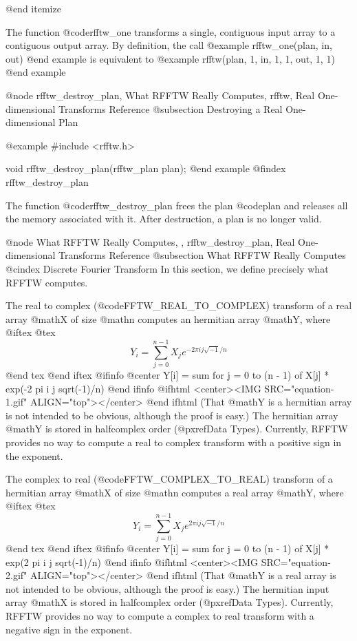 @end itemize

The function @code{rfftw_one} transforms a single, contiguous input array
to a contiguous output array.  By definition, the call
@example
rfftw_one(plan, in, out)
@end example
is equivalent to
@example
rfftw(plan, 1, in, 1, 1, out, 1, 1)
@end example

@node    rfftw_destroy_plan, What RFFTW Really Computes, rfftw, Real One-dimensional Transforms Reference
@subsection Destroying a Real One-dimensional Plan

@example
#include <rfftw.h>

void rfftw_destroy_plan(rfftw_plan plan);
@end example
@findex rfftw_destroy_plan

The function @code{rfftw_destroy_plan} frees the plan @code{plan} and
releases all the memory associated with it.  After destruction, a plan
is no longer valid.

@node What RFFTW Really Computes,  , rfftw_destroy_plan, Real One-dimensional Transforms Reference
@subsection What RFFTW Really Computes
@cindex Discrete Fourier Transform
In this section, we define precisely what RFFTW computes. 

The real to complex (@code{FFTW_REAL_TO_COMPLEX}) transform of a real
array @math{X} of size @math{n} computes an hermitian array @math{Y},
where
@iftex
@tex
$$
Y_i = \sum_{j = 0}^{n - 1} X_j e^{-2\pi i j \sqrt{-1}/n}
$$
@end tex
@end iftex
@ifinfo
@center Y[i] = sum for j = 0 to (n - 1) of X[j] * exp(-2 pi i j sqrt(-1)/n)
@end ifinfo
@ifhtml
<center><IMG SRC="equation-1.gif" ALIGN="top"></center>
@end ifhtml
(That @math{Y} is a hermitian array is not intended to be obvious,
although the proof is easy.)  The hermitian array @math{Y} is stored in
halfcomplex order (@pxref{Data Types}).  Currently, RFFTW provides no
way to compute a real to complex transform with a positive sign in the
exponent.

The complex to real (@code{FFTW_COMPLEX_TO_REAL}) transform of a hermitian
array @math{X} of size @math{n} computes a real array @math{Y}, where
@iftex
@tex
$$
Y_i = \sum_{j = 0}^{n - 1} X_j e^{2\pi i j \sqrt{-1}/n}
$$
@end tex
@end iftex
@ifinfo
@center Y[i] = sum for j = 0 to (n - 1) of X[j] * exp(2 pi i j sqrt(-1)/n)
@end ifinfo
@ifhtml
<center><IMG SRC="equation-2.gif" ALIGN="top"></center>
@end ifhtml
(That @math{Y} is a real array is not intended to be obvious, although
the proof is easy.)  The hermitian input array @math{X} is stored in
halfcomplex order (@pxref{Data Types}).  Currently, RFFTW provides no
way to compute a complex to real transform with a negative sign in the
exponent.

